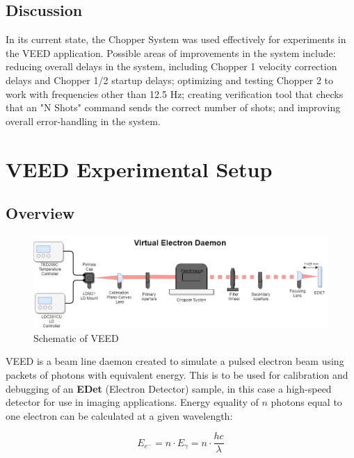 \documentclass{article}
\begin{document}
    \subsection{Discussion}
    
    In its current state, the Chopper System was used effectively for experiments in the VEED application. Possible areas of improvements in the system include: reducing overall delays in the system, including Chopper 1 velocity correction delays and Chopper 1/2 startup delays; optimizing and testing Chopper 2 to work with frequencies other than 12.5 Hz; creating verification tool that checks that an "N Shots" command sends the correct number of shots; and improving overall error-handling in the system.
    
\section{VEED Experimental Setup} \label{veed_setup}
    
    \subsection{Overview} \label{veed_setup_overview}
    
    \begin{figure}[h]
        \centering
        \includegraphics[width=1.0\textwidth]{img/veed_schematic}
        \caption{Schematic of VEED}
        \label{fig:veed_schematic}
    \end{figure}
            
    VEED is a beam line daemon created to simulate a pulsed electron beam using packets of photons with equivalent energy. This is to be used for calibration and debugging of an \textbf{EDet} (Electron Detector) sample, in this case a high-speed detector for use in imaging applications. Energy equality of $n$ photons equal to one electron can be calculated at a given wavelength:
    
    \begin{equation}
        E_{e^-} = n \cdot E_{\gamma} = n \cdot \frac{hc}{\lambda}
    \end{equation}
    
\end{document}
